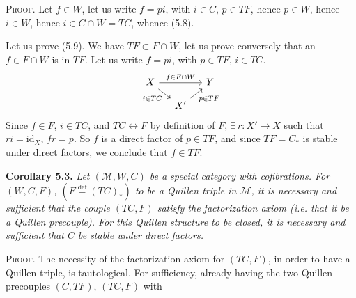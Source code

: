 \documentclass[11pt]{article}
\newcommand{\msp}[1]{\marginpar{\footnotesize [#1]}}
\newcommand{\defeq}{\overset{\text{def}}{=}}
\begin{document}
\textsc{Proof}. Let $f \in W$, let us write $f = pi$, with $i \in C$, $p \in TF$, hence $p \in W$, hence $i \in W$, hence $i \in C \cap W = TC$, whence (5.8).

Let us prove (5.9). We have $TF \subset F \cap W$, let us prove conversely that an $f \in F \cap W$ is in $TF$. Let us write $f = pi$, with $p \in TF$, $i \in TC$.
\[
\begin{tikzcd}[column sep=small, row sep=small]
X \arrow[rr, "f\in F\cap W"] \arrow[dr, "i\in TC"'] & & Y \\
& X' \arrow[ur, "p\in TF"'] &
\end{tikzcd}
\]
Since $f \in F$, $i \in TC$, and $TC \longleftrightarrow F$ by definition of $F$, $\exists\, r : X' \longrightarrow X$ such that $ri = \mathrm{id}_X$, $fr = p$. So $f$ is a direct factor of $p \in TF$, and since $TF = C_{*}$ is stable under direct factors, we conclude that $f \in TF$.

\textbf{Corollary 5.3.} \textit{Let $(\mathcal{M}, W, C)$ be a special category with cofibrations. For $(W, C, F)$, $(F \defeq (TC)_{*})$ to be a Quillen triple in $\mathcal{M}$, it is necessary and sufficient that the couple $(TC, F)$ satisfy the factorization axiom (i.e. that it be a Quillen precouple). For this Quillen structure to be closed, it is necessary and sufficient that $C$ be stable under direct factors.} %

\msp{page 88}

\textsc{Proof}. The necessity of the factorization axiom for $(TC, F)$, in order to have a Quillen triple, is tautological. For sufficiency, already having the two Quillen precouples $(C, TF)$, $(TC, F)$ with
\end{document}
